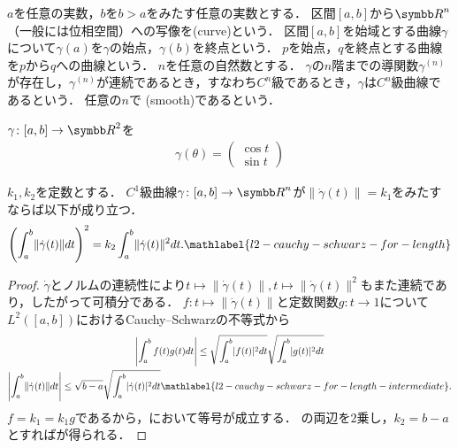 \documentclass{ltjsbook}
\begin{document}

\(a\)を任意の実数，\(b\)を\(b > a\)をみたす任意の実数とする．
区間\([a, b]\)から\({\Real}^n\)（一般には位相空間）への写像を(curve)という．
区間\([a, b]\)を始域とする曲線\(\gamma\)について\(\gamma(a)\)を\(\gamma\)の始点，\(\gamma(b)\)を終点という．
\(p\)を始点，\(q\)を終点とする曲線を\(p\)から\(q\)への曲線という．
\(n\)を任意の自然数とする．
\(\gamma\)の\(n\)階までの導関数\(\gamma^{(n)}\)が存在し，\(\gamma^{(n)}\)が連続であるとき，すなわち\(C^n\)級であるとき，\(\gamma\)は\(C^n\)級曲線であるという．
任意の\(n\)で
(smooth)であるという．

\begin{example} \(\gamma\colon [a, b] \to {\Real}^2\)を
\begin{align*}
    \gamma(\theta) = \begin{pmatrix}
        \cos t \\
        \sin t
    \end{pmatrix}
\end{align*}
\end{example}

\begin{thmbox}
\begin{proposition}
\(k_1, k_2\)を定数とする．
\(C^1\)級曲線\(\gamma \colon [a, b] \to {\Real}^n\)が\(\lVert \dot{\gamma}(t) \rVert = k_1\)をみたすならば以下が成り立つ．
\begin{align}
    \left(\int_a^b \lVert \dot{\gamma}(t) \rVert dt \right)^2
    = k_2 \int_a^b \lVert \dot{\gamma}(t) \rVert^2 dt.
    \mathlabel{l2-cauchy-schwarz-for-length}
\end{align}
\end{proposition}
\end{thmbox}

\begin{proof} \(\dot{\gamma}\)とノルムの連続性により\(t \mapsto \lVert \dot{\gamma}(t) \rVert, t \mapsto \lVert \dot{\gamma}(t) \rVert^2\)もまた連続であり，したがって可積分である．
\(f\colon t \mapsto \lVert \dot{\gamma}(t) \rVert\)と定数関数\(g \colon t \to 1\)について\(L^2([a, b])\)におけるCauchy--Schwarzの不等式から
\begin{gather}
    \left\lvert \int_a^b f(t) g(t) dt \right\rvert \leq \sqrt{\int_a^b \lvert f(t) \rvert^2 dt} \sqrt{\int_a^b \lvert g(t) \rvert^2 dt} \notag \\
    \left\lvert \int_a^b \lVert \dot{\gamma}(t) \rVert dt \right\rvert \leq \sqrt{b - a} \sqrt{\int_a^b \lvert \dot{\gamma}(t) \rvert^2 dt} \mathlabel{l2-cauchy-schwarz-for-length-intermediate}.
\end{gather}
\(f = k_1 = k_1 g\)であるから，において等号が成立する．
の両辺を\(2\)乗し，\(k_2 = b - a\)とすればが得られる．
\end{proof}
\end{document}
